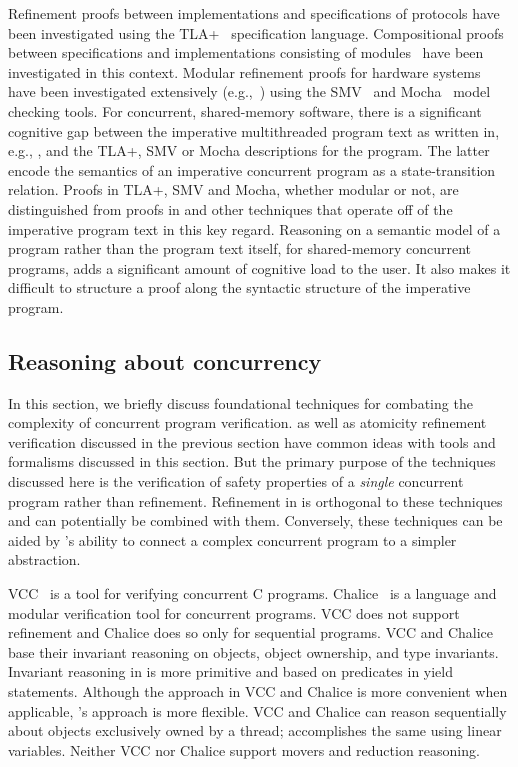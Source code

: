 Refinement proofs
between implementations and specifications of protocols have been
investigated using the TLA+~\cite{Lamport2004} specification
language. 
Compositional proofs between specifications and
implementations consisting of modules~\cite{AbadiAssumeGuarantee} have
been investigated in this context. 
Modular refinement proofs for hardware systems have been investigated extensively
(e.g.,~\cite{Henzinger1999,Eiriksson2000}) using the SMV~\cite{McMillan00} and Mocha~\cite{AlurHMQRT98} 
model checking tools.
For concurrent, shared-memory
software, there is a significant cognitive gap between the imperative
multithreaded program text as written in, e.g., \civl, and the TLA+,
SMV or Mocha descriptions for the program. 
The latter encode the
semantics of an imperative concurrent program as a
state-transition relation. 
Proofs in TLA+, SMV and Mocha, whether modular or not, are
distinguished from proofs in \civl and other techniques that operate
off of the imperative program text in this key regard. 
Reasoning on a
semantic model of a program rather than the program text itself, for
shared-memory concurrent programs, adds a significant amount of
cognitive load to the user. 
It also makes it difficult to structure a
proof along the syntactic structure of the imperative program. 

\subsection{Reasoning about concurrency}
In this section, we briefly discuss foundational techniques
for combating the complexity of concurrent program verification. 
\civl as well as atomicity refinement verification discussed in the previous
section have common ideas with tools and formalisms
discussed in this section. But the primary purpose of the techniques
discussed here is the verification of safety properties of a {\em single} concurrent program rather than refinement. 
Refinement in \civl is orthogonal to these techniques and can potentially be combined with them.
Conversely, these techniques can be aided by \civl's 
ability to connect a complex concurrent program to a simpler abstraction.

VCC~\cite{VCC} is a tool for verifying concurrent C programs.  
Chalice~\cite{LM09} is a language and modular verification tool for concurrent programs. 
VCC does not support refinement and Chalice does so only for sequential programs.  
VCC and Chalice base their invariant reasoning on objects, object ownership, and type invariants. 
Invariant reasoning in \civl is more primitive and based on predicates in yield statements. 
Although the approach in VCC and Chalice is more convenient when applicable, \civl's approach is more flexible. 
VCC and Chalice can reason sequentially about objects exclusively owned by a thread;
\civl accomplishes the same using linear variables.
Neither VCC nor Chalice support movers and reduction reasoning.

